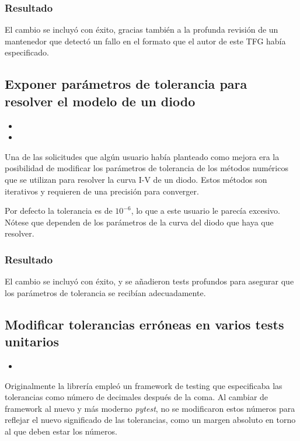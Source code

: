 \subsubsection{Resultado}

El cambio se incluyó con éxito, gracias también a la profunda revisión de un mantenedor que detectó un fallo en el formato que el autor de este TFG había especificado.

\subsection{Exponer parámetros de tolerancia para resolver el modelo de un diodo}

\begin{itemize}
    \item {}
    \item {}
\end{itemize}

Una de las solicitudes que algún usuario había planteado como mejora era la posibilidad de modificar los parámetros de tolerancia de los métodos numéricos que se utilizan para resolver la curva I-V de un diodo. Estos métodos son iterativos y requieren de una precisión para converger.

Por defecto la tolerancia es de $10^{-6}$, lo que a este usuario le parecía excesivo. Nótese que dependen de los parámetros de la curva del diodo que haya que resolver.

\subsubsection{Resultado}

El cambio se incluyó con éxito, y se añadieron tests profundos para asegurar que los parámetros de tolerancia se recibían adecuadamente.

\subsection{Modificar tolerancias erróneas en varios tests unitarios}

\begin{itemize}
    \item {}
\end{itemize}

Originalmente la librería empleó un framework de testing que especificaba las tolerancias como número de decimales después de la coma. Al cambiar de framework al nuevo y más moderno \textit{pytest}, no se modificaron estos números para reflejar el nuevo significado de las tolerancias, como un margen absoluto en torno al que deben estar los números.

